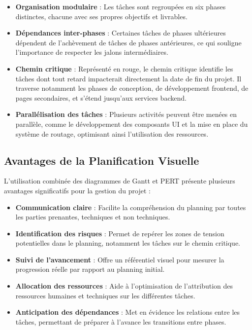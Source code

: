 \begin{itemize}[leftmargin=*,noitemsep,topsep=0pt]
  \item \textbf{Organisation modulaire} : Les tâches sont regroupées en six phases distinctes, chacune avec ses propres objectifs et livrables.
  
  \item \textbf{Dépendances inter-phases} : Certaines tâches de phases ultérieures dépendent de l'achèvement de tâches de phases antérieures, ce qui souligne l'importance de respecter les jalons intermédiaires.
  
  \item \textbf{Chemin critique} : Représenté en rouge, le chemin critique identifie les tâches dont tout retard impacterait directement la date de fin du projet. Il traverse notamment les phases de conception, de développement frontend, de pages secondaires, et s'étend jusqu'aux services backend.
  
  \item \textbf{Parallélisation des tâches} : Plusieurs activités peuvent être menées en parallèle, comme le développement des composants UI et la mise en place du système de routage, optimisant ainsi l'utilisation des ressources.
\end{itemize}

\subsection{Avantages de la Planification Visuelle}

L'utilisation combinée des diagrammes de Gantt et PERT présente plusieurs avantages significatifs pour la gestion du projet :

\begin{itemize}[leftmargin=*,noitemsep,topsep=0pt]
  \item \textbf{Communication claire} : Facilite la compréhension du planning par toutes les parties prenantes, techniques et non techniques.
  
  \item \textbf{Identification des risques} : Permet de repérer les zones de tension potentielles dans le planning, notamment les tâches sur le chemin critique.
  
  \item \textbf{Suivi de l'avancement} : Offre un référentiel visuel pour mesurer la progression réelle par rapport au planning initial.
  
  \item \textbf{Allocation des ressources} : Aide à l'optimisation de l'attribution des ressources humaines et techniques sur les différentes tâches.
  
  \item \textbf{Anticipation des dépendances} : Met en évidence les relations entre les tâches, permettant de préparer à l'avance les transitions entre phases.
\end{itemize}

